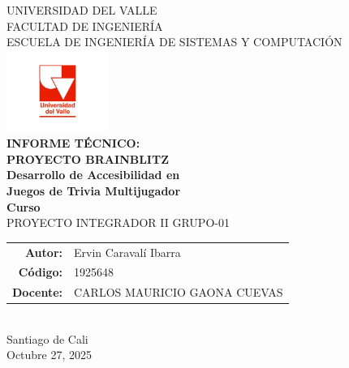 \documentclass[12pt]{article}
\begin{document}
\begin{titlepage}
    \begin{center}
        \vspace*{-1cm}
        {\Large UNIVERSIDAD DEL VALLE}\\[0.3cm]
        {\large FACULTAD DE INGENIERÍA}\\[0.3cm]
        {\large ESCUELA DE INGENIERÍA DE SISTEMAS Y COMPUTACIÓN}\\[2cm]
        
        \includegraphics[width=0.25\textwidth]{Universidad-del-Valle.jpg}\\[1.5cm]
        
        {\Huge\bfseries INFORME TÉCNICO:\\[0.3cm]
        PROYECTO BRAINBLITZ}\\[0.8cm]
        {\Large\bfseries Desarrollo de Accesibilidad en\\
        Juegos de Trivia Multijugador}\\[1.5cm]
        
        {\large\bfseries Curso}\\[0.3cm]
        {\large PROYECTO INTEGRADOR II GRUPO-01}\\[1.5cm]
        
        \begin{tabular}{rl}
            \textbf{Autor:} & Ervin Caravalí Ibarra \\[0.3cm]
            \textbf{Código:} & 1925648 \\[0.3cm]
            \textbf{Docente:} & CARLOS MAURICIO GAONA CUEVAS \\[0.3cm]
        \end{tabular}\\[1cm]
        
        {\large Santiago de Cali}\\[0.3cm]
        {\large Octubre 27, 2025}
        
        \vfill
    \end{center}
\end{titlepage}
\end{document}
